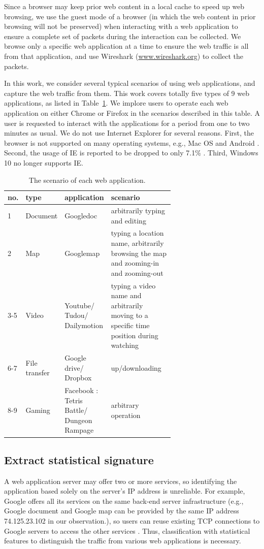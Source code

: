 Since a browser may keep prior web content in a local cache to speed up web browsing, we use the guest mode of a browser (in which the web content in prior browsing will not be preserved) when interacting with a web application to ensure a complete set of packets during the interaction can be collected. We browse only a specific web application at a time to ensure the web traffic is all from that application, and use Wireshark (\url{www.wireshark.org}) to collect the packets. 

In this work, we consider several typical scenarios of using web applications, and capture the web traffic from them. This work covers totally five types of 9 web applications, as listed in Table~\ref{table:scenario_app}. We implore users to operate each web application on either Chrome or Firefox in the scenarios described in this table. A user is requested to interact with the applications for a period from one to two minutes as usual. We do not use Internet Explorer for several reasons. First, the browser is not supported on many operating systems, e.g., Mac OS and Android \cite{IBR}. Second, the usage of IE is reported to be dropped to only 7.1\% \cite{BS}. Third, Windows 10 no longer supports IE. 



\begin{table}[ht]
\centering
\caption{The scenario of each web application.}
\begin{tabular}{|l|l|p{0.2\linewidth}|p{0.45\linewidth}|}
\hline no. &type &application &scenario \\
\hline
\hline 1 &Document &Googledoc & arbitrarily typing and editing\\
\hline 2 &Map  &Googlemap & typing a location name, arbitrarily browsing the map and zooming-in and zooming-out\\
\hline 3-5 &Video  & Youtube/ Tudou/ Dailymotion & typing a video name and arbitrarily moving to a specific time position during watching\\
\hline 6-7 &File transfer & Google drive/ Dropbox & up/downloading \\
\hline 8-9 &Gaming &Facebook : Tetris Battle/ Dungeon Rampage & arbitrary operation\\
\hline 
\end{tabular}
\label{table:scenario_app}
\end{table}


\subsection{Extract statistical signature}
A web application server may offer two or more services, so identifying the application based solely on the server's IP address is unreliable. For example, Google offers all its services on the same back-end server infrastructure (e.g., Google document and Google map can be provided by the same IP address 74.125.23.102 in our observation.), so users can reuse existing TCP connections to Google servers to access the other services \cite{TNW08}. Thus, classification with statistical features to distinguish the traffic from various web applications is necessary. 

